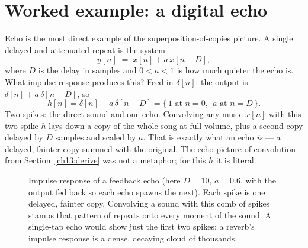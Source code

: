\section{Worked example: a digital echo}
\label{ch13:echo}

Echo is the most direct example of the superposition-of-copies picture. A
single delayed-and-attenuated repeat is the system
\begin{equation}
\label{ch13:echo-def}
y[n] \;=\; x[n] + a\,x[n-D],
\end{equation}
where $D$ is the delay in samples and $0 < a < 1$ is how much quieter the echo
is. What impulse response produces this? Feed in $\delta[n]$: the output is
$\delta[n] + a\,\delta[n-D]$, so
\[
h[n] = \delta[n] + a\,\delta[n-D]
     = \{\,1 \text{ at } n{=}0,\ \ a \text{ at } n{=}D\,\}.
\]
Two spikes: the direct sound and one echo. Convolving any music $x[n]$ with this
two-spike $h$ lays down a copy of the whole song at full volume, plus a second
copy delayed by $D$ samples and scaled by $a$. That is exactly what an echo
\emph{is} --- a delayed, fainter copy summed with the original. The echo picture
of convolution from Section~\ref{ch13:derive} was not a metaphor; for this $h$
it is literal.

\begin{figure}[H]
\centering
{}
\caption{Impulse response of a feedback echo (here $D=10$, $a=0.6$, with the
output fed back so each echo spawns the next). Each spike is one delayed, fainter
copy. Convolving a sound with this comb of spikes stamps that pattern of repeats
onto every moment of the sound. A single-tap echo would show just the first two
spikes; a reverb's impulse response is a dense, decaying cloud of thousands.}
\label{ch13:fig-echo}
\end{figure}

